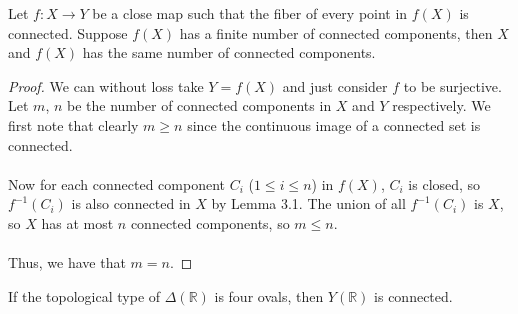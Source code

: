 \documentclass{article}
\newcommand{\Rbb}{\mathbb{R}}
\begin{document}
\begin{lemma}
Let $f: X \to Y$ be a close map such that the fiber of every point in $f(X)$ is connected. Suppose $f(X)$ has a finite number of connected components, then $X$ and $f(X)$ has the same number of connected components.
\end{lemma}

\begin{proof}
We can without loss take $Y = f(X)$ and just consider $f$ to be surjective. Let $m$, $n$ be the number of connected components in $X$ and $Y$ respectively. We first note that clearly $m \geq n$ since the continuous image of a connected set is connected.\\\\
Now for each connected component $C_i$ ($1 \leq i \leq n$) in $f(X)$, $C_i$ is closed, so $f^{-1}(C_i)$ is also connected in $X$ by Lemma 3.1. The union of all $f^{-1}(C_i)$ is $X$, so $X$ has at most $n$ connected components, so $m \leq n$.\\\\
Thus, we have that $m = n$.
\end{proof}

\begin{proposition}
If the topological type of $\Delta(\Rbb)$ is four ovals, then $Y(\Rbb)$ is connected.
\end{proposition}
\end{document}
